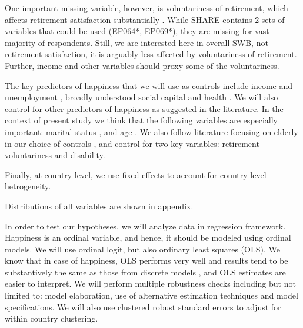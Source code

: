\documentclass[10pt, letterpaper]{article}
\begin{document}
\begin{spacing}{1.4}
One important missing variable, however, is voluntariness of retirement, which
affects retirement satisfaction substantially \citep{bender12}. While SHARE
contains 2 sets of variables that could be used (EP064*, EP069*), they are
missing for vast majority of respondents. Still, we are interested here in
overall SWB, not retirement satisfaction, it is arguably less affected by
voluntariness of retirement. Further, income and other variables should proxy
some of the voluntariness.

The key predictors of happiness that we will use as controls include income and
unemployment \citep[][]{ditella01moa,ditella01mob,ditella06m}, broadly
understood social
capital and health \citep{blanchflower11,dolan08al,bonsang12}. %
We will also control for other predictors of happiness as suggested in the 
literature. In the context of present study we think that the following
variables are especially important: marital status \citep[e.g.,][]{myers00,diener04s}, and age \citep{ferring10}. 
%
We also follow literature focusing on elderly in our choice of controls
\citep[e.g.,][]{meier2008volunteering,bonsang12,bender12,ferring10}, and control
for two key variables:  retirement voluntariness and disability. 

Finally, at country level, we use fixed effects to account for country-level hetrogeneity.

Distributions of all variables are shown in appendix.

In order to test our hypotheses, we will analyze data in regression framework. 
Happiness is an ordinal variable, and hence, it should be modeled using ordinal
models. We will use ordinal logit, but also ordinary least squares (OLS). We know that
in case of happiness, OLS performs very well and results tend to be substantively
the same as those from discrete models \citep{carbonell04,blanchflower11}, and
OLS estimates are easier to interpret.
We will perform multiple robustness checks including but not limited to: model
elaboration, use of alternative estimation techniques and model specifications.
We will also use clustered robust standard errors to adjust for within country clustering.




\end{spacing}
\end{document}
